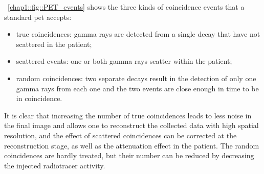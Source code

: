 \figurename~\ref{chap1::fig::PET_events} shows the three kinds of coincidence events that a standard \gls{pet} accepts: 
\begin{itemize}
\item true coincidences: gamma rays are detected from a single decay that have not scattered in the patient;
\item scattered events: one or both gamma rays scatter within the patient;
\item random coincidences: two separate decays result in the detection of only one gamma rays from each one and the two events are close enough in time to be in coincidence.
\end{itemize}
It is clear that increasing the number of true coincidences leads to less noise in the final image and allows one to reconstruct the collected data with high spatial resolution, and the effect of scattered coincidences can be corrected at the reconstruction stage, as well as the attenuation effect in the patient. The random coincidences are hardly treated, but their number can be reduced by decreasing the injected radiotracer activity.

